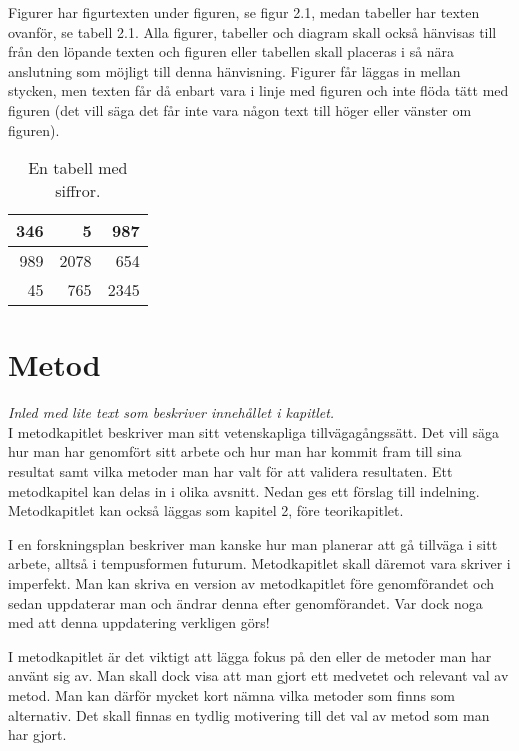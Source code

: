 \documentclass[a4paper,12pt]{article} %
\begin{document}
Figurer har figurtexten under figuren, se figur 2.1, medan tabeller har texten ovanför, se tabell 2.1. Alla figurer, tabeller och diagram skall också hänvisas till från den löpande texten och figuren eller tabellen skall placeras i så nära anslutning som möjligt till denna hänvisning. Figurer får läggas in mellan stycken, men texten får då enbart vara i linje med figuren och inte flöda tätt med figuren (det vill säga det får inte vara någon text till höger eller vänster om figuren). \\

\begin{table}[H]
\centering
\begin{tabular}{|r|r|r|}\hline
346 & 5 & 987 \\ \hline
989 & 2078 & 654 \\ \hline
45 & 765 & 2345 \\ \hline
\end{tabular}
\caption{En tabell med siffror.}
\label{tabell1}
\end{table}

\newpage

\section{Metod}
\emph{Inled med lite text som beskriver innehållet i kapitlet.}\\
I metodkapitlet beskriver man sitt vetenskapliga tillvägagångssätt. Det vill säga hur man har genomfört sitt arbete och hur man har kommit fram till sina resultat samt vilka metoder man har valt för att validera resultaten. Ett metodkapitel kan delas in i olika avsnitt. Nedan ges ett förslag till indelning. Metodkapitlet kan också läggas som kapitel 2, före teorikapitlet.

I en forskningsplan beskriver man kanske hur man planerar att gå tillväga i sitt arbete, alltså i tempusformen futurum. Metodkapitlet skall däremot vara skriver i imperfekt. Man kan skriva en version av metodkapitlet före genomförandet och sedan uppdaterar man och ändrar denna efter genomförandet. Var dock noga med att denna uppdatering verkligen görs!

I metodkapitlet är det viktigt att lägga fokus på den eller de metoder man har använt sig av. Man skall dock visa att man gjort ett medvetet och relevant val av metod. Man kan därför mycket kort nämna vilka metoder som finns som alternativ. Det skall finnas en tydlig motivering till det val av metod som man har gjort.
\end{document}
